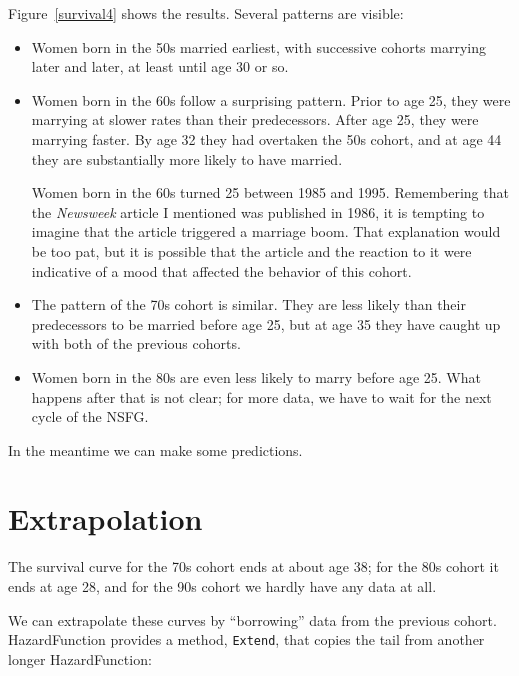 \documentclass[12pt]{book}
\theoremstyle{exercise}
\begin{document}
Figure~\ref{survival4} shows the results.  Several patterns are
visible:

\begin{itemize}

\item Women born in the 50s married earliest, with successive
  cohorts marrying later and later, at least until age 30 or so.

\item Women born in the 60s follow a surprising pattern.  Prior
to age 25, they were marrying at slower rates than their predecessors.
After age 25, they were marrying faster.  By age 32 they had overtaken
the 50s cohort, and at age 44 they are substantially more likely to
have married.%

Women born in the 60s turned 25 between 1985 and 1995.  Remembering
that the {\it Newsweek\/} article I mentioned was published in 1986, it
is tempting to imagine that the article triggered a marriage boom.
That explanation would be too pat, but it is possible that the article
and the reaction to it were indicative of a mood that affected the
behavior of this cohort.%

\item The pattern of the 70s cohort is similar.  They are less
likely than their predecessors to be married before age 25, but
at age 35 they have caught up with both of the previous cohorts.

\item Women born in the 80s are even less likely to marry before
age 25.  What happens after that is not clear; for more data, we
have to wait for the next cycle of the NSFG.

\end{itemize}

In the meantime we can make some predictions.%


\section{Extrapolation}

The survival curve for the 70s cohort ends at about age 38;
for the 80s cohort it ends at age 28, and for the 90s cohort
we hardly have any data at all.%

We can extrapolate these curves by ``borrowing'' data from the
previous cohort.  HazardFunction provides a method, {\tt Extend}, that
copies the tail from another longer HazardFunction:%
\end{document}
